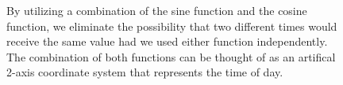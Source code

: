 \begin{adjustwidth}{-1.65cm}{-0.0cm}
\begin{enumerate}[label=Step 3.\arabic*:, leftmargin=*]
    \begin{figure}[H]
        \begin{adjustwidth}{-3.0cm}{-3.0cm}%
                \myfloatalign
                 \quad
                 \quad
                \caption{By utilizing a combination of the sine function and the cosine function, we eliminate the possibility that two different times would receive the same value had we used either function independently. The combination of both functions can be thought of as an artifical 2-axis coordinate system that represents the time of day.}
        \end{adjustwidth}
    \end{figure}
    

\end{enumerate}
\end{adjustwidth}
